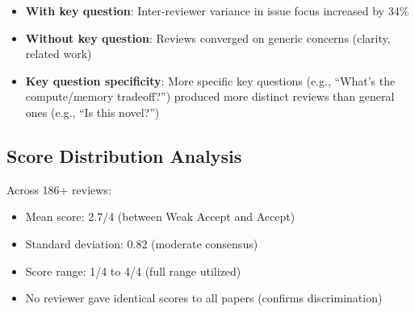 \begin{itemize}
    \item \textbf{With key question}: Inter-reviewer variance in issue focus increased by 34\%
    \item \textbf{Without key question}: Reviews converged on generic concerns (clarity, related work)
    \item \textbf{Key question specificity}: More specific key questions (e.g., ``What's the compute/memory tradeoff?'') produced more distinct reviews than general ones (e.g., ``Is this novel?'')
\end{itemize}

\subsection{Score Distribution Analysis}

Across 186+ reviews:
\begin{itemize}
    \item Mean score: 2.7/4 (between Weak Accept and Accept)
    \item Standard deviation: 0.82 (moderate consensus)
    \item Score range: 1/4 to 4/4 (full range utilized)
    \item No reviewer gave identical scores to all papers (confirms discrimination)
\end{itemize}
